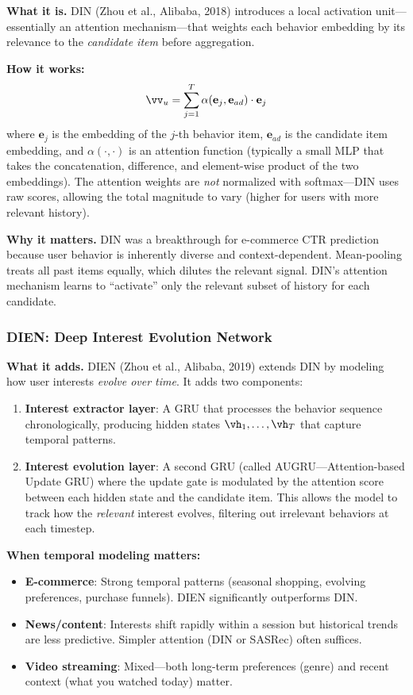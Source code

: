 \textbf{What it is.} DIN (Zhou et al., Alibaba, 2018) introduces a local activation unit---essentially an attention mechanism---that weights each behavior embedding by its relevance to the \textit{candidate item} before aggregation.

\textbf{How it works:}
\begin{equation}
\vv_u = \sum_{j=1}^{T} \alpha(\mathbf{e}_j, \mathbf{e}_{ad}) \cdot \mathbf{e}_j
\end{equation}
where $\mathbf{e}_j$ is the embedding of the $j$-th behavior item, $\mathbf{e}_{ad}$ is the candidate item embedding, and $\alpha(\cdot, \cdot)$ is an attention function (typically a small MLP that takes the concatenation, difference, and element-wise product of the two embeddings). The attention weights are \textit{not} normalized with softmax---DIN uses raw scores, allowing the total magnitude to vary (higher for users with more relevant history).

\textbf{Why it matters.} DIN was a breakthrough for e-commerce CTR prediction because user behavior is inherently diverse and context-dependent. Mean-pooling treats all past items equally, which dilutes the relevant signal. DIN's attention mechanism learns to ``activate'' only the relevant subset of history for each candidate.

\subsubsection{DIEN: Deep Interest Evolution Network}

\textbf{What it adds.} DIEN (Zhou et al., Alibaba, 2019) extends DIN by modeling how user interests \textit{evolve over time}. It adds two components:
\begin{enumerate}
    \item \textbf{Interest extractor layer}: A GRU that processes the behavior sequence chronologically, producing hidden states $\vh_1, \ldots, \vh_T$ that capture temporal patterns.
    \item \textbf{Interest evolution layer}: A second GRU (called AUGRU---Attention-based Update GRU) where the update gate is modulated by the attention score between each hidden state and the candidate item. This allows the model to track how the \textit{relevant} interest evolves, filtering out irrelevant behaviors at each timestep.
\end{enumerate}

\textbf{When temporal modeling matters:}
\begin{itemize}
    \item \textbf{E-commerce}: Strong temporal patterns (seasonal shopping, evolving preferences, purchase funnels). DIEN significantly outperforms DIN.
    \item \textbf{News/content}: Interests shift rapidly within a session but historical trends are less predictive. Simpler attention (DIN or SASRec) often suffices.
    \item \textbf{Video streaming}: Mixed---both long-term preferences (genre) and recent context (what you watched today) matter.
\end{itemize}

